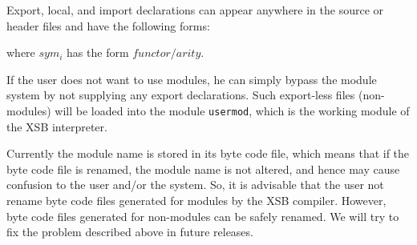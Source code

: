 Export, local, and import declarations can appear anywhere in the source
or header files and have the following forms:




\noindent
where $sym_i$ has the form $functor/arity$.

If the user does not want to use modules, he can simply
bypass the module system by not supplying any export declarations.
Such export-less files (non-modules) will be loaded into the module 
{\tt usermod}, which is the working module of the XSB interpreter.

Currently the module name is stored in its byte code file, which means
that if the byte code file is renamed, the module name is not altered,
and hence may cause confusion to the user and/or the system.  So, it
is advisable that the user not rename byte code files generated for
modules by the XSB compiler.  However, byte code files generated for
non-modules can be safely renamed.  We will try to fix the problem
described above in future releases.

